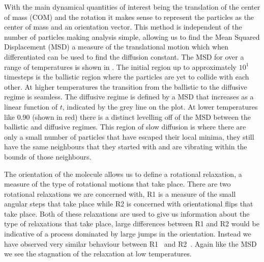 With the main dynamical quantities of interest being the translation of the center of mass (COM) and the rotation it makes sense to represent the particles as the center of mass and an orientation vector. This method is independent of the number of particles making analysis simple, allowing us to find the Mean Squared Displacement (MSD) a measure of the translational motion which when differentiated can be used to find the diffusion constant. The MSD for \sone over a range of temperatures is shown in . The initial region up to approximately $10^1$ timesteps is the ballistic region where the particles are yet to collide with each other. At higher temperatures the transition from the ballistic to the diffusive regime is seamless. The diffusive regime is defined by a MSD that increases as a linear function of $t$, indicated by the grey line on the plot. At lower temperatures like 0.90 (shown in red) there is a distinct levelling off of the MSD between the ballistic and diffusive regimes. This region of slow diffusion is where there are only a small number of particles that have escaped their local minima, they still have the same neighbours that they started with and are vibrating within the bounds of those neighbours.

The orientation of the molecule allows us to define a rotational relaxation, a measure of the type of rotational motions that take place. There are two rotational relaxations we are concerned with, R1 is a measure of the small angular steps that take place while R2 is concerned with orientational flips that take place. Both of these relaxations are used to give us information about the type of relaxations that take place, large differences between R1 and R2 would be indicative of a process dominated by large jumps in the orientation. Instead we have observed very similar behaviour between R1~ and R2~. Again like the MSD we see the stagnation of the relaxation at low temperatures.

